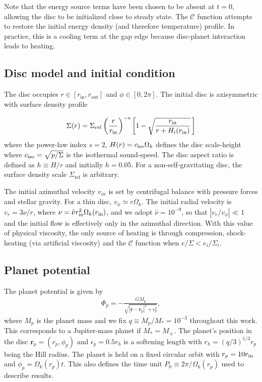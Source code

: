 Note that the energy source terms
have been chosen to be absent at $t=0$, allowing the disc to be
initialized close to steady state. The $\mathcal{C}$ function attempts
to restore the initial energy density (and 
therefore temperature) profile. In practice, this is a cooling term at
the gap edge because disc-planet interaction leads to heating.  

\subsection{Disc model and initial condition}
The disc occupies $r\in[r_\mathrm{in}, r_\mathrm{out}]$ and
$\phi\in[0,2\pi]$. The initial disc is axisymmetric with  
surface density profile  
 
\begin{align}\label{initial_density}
   \Sigma(r) = \Sigma_\mathrm{ref}\left(\frac{r}{r_\mathrm{in}}\right)^{-s}
    \left[1 - \sqrt{\frac{r_\mathrm{in}}{r + H_i(r_\mathrm{in})}}\,\right] 
\end{align}
where the power-law index $s=2$, $H(r) = c_\mathrm{iso}\Omega_k $ defines the disc scale-height 
where $c_\mathrm{iso}=\sqrt{p/\Sigma}$ is the isothermal sound-speed. The disc aspect ratio is defined as $h\equiv H/r$ and initially
$h=0.05$. For a non-self-gravitating disc, the surface density scale
$\Sigma_\mathrm{ref}$ is arbitrary. 

The initial azimuthal velocity $v_{\phi i}$ is set by centrifugal balance with
pressure forces and stellar gravity. For a thin disc, 
$v_{\phi}\simeq r\Omega_k$. The initial radial velocity is
$v_{r}=3\nu/r$, where $\nu = \hat{\nu}r_\mathrm{in}^2\Omega_k(r_\mathrm{in})$, and we
adopt $\hat{\nu}= 10^{-9}$, so that $|v_{r}/v_{\phi}|\ll1$ and the initial 
flow is effectively only in the azimuthal direction.  With this value 
of physical viscosity, the only source of heating is through
compression, shock-heating (via artificial viscosity) and the
$\mathcal{C}$ function when $e/\Sigma<e_i/\Sigma_i$. 

\subsection{Planet potential}\label{planet_config}
The planet potential is given by 
\begin{align}
  \Phi_p = -\frac{GM_p}{\sqrt{|\bm{r} - \bm{r}_p|^2 + \epsilon_p^2}},
\end{align}
where $M_p$ is the planet mass and we fix $q\equiv M_p/M_*=10^{-3}$
throughout this work. This corresponds to a Jupiter-mass planet if $M_*=M_{\sun}$. 
The planet's position in the disc 
$\bm{r}_p=(r_p,\phi_p)$  and $\epsilon_p=0.5r_h$ is a softening
length with $r_h=(q/3)^{1/3}r_p$ being the Hill radius.  
The planet is held on a fixed circular orbit with $ r_p = 10r_\mathrm{in}$ and $\phi_p=\Omega_k(r_p)t$. 
This also
defines the time unit $P_0\equiv 2\pi/\Omega_k(r_p)$ used to describe results. 


